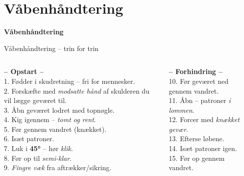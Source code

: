 \section{Våbenhåndtering}

\begin{frame}
  \vspace{3em}
  \begin{center}
    {\LARGE \textbf{Våbenhåndtering}}
  \end{center}
\end{frame}



\begin{frame}{Våbenhåndtering – trin for trin}
  \vspace{0.3em} %
  \begin{columns}[T]
    \setlength{\parskip}{0.28em} %
    \footnotesize
    \RaggedRight

    \textbf{-- Opstart --} \\
    1. Fødder i skudretning – fri for mennesker. \\
    2. Forskæfte med \textit{modsatte hånd} af skulderen du vil lægge geværet til. \\
    3. Åbn geværet lodret med topnøgle. \\
    4. Kig igennem – \textit{tomt og rent}. \\
    5. Før gennem vandret (knækket). \\
    6. Isæt patroner. \\
    7. Luk i \textbf{45°} – hør \textit{klik}. \\
    8. Før op til \textit{semi-klar}. \\
    9. \textit{Fingre væk} fra aftrækker/sikring. \par

    \vspace{0.3em} %
    \textbf{-- Forhindring --} \\
    10. Før geværet ned gennem vandret. \\
    11. Åbn – patroner \textit{i lommen}. \\
    12. Forcer med \textit{knækket gevær}. \\
    13. Efterse løbene. \\
    14. Isæt patroner igen. \\
    15. Før op gennem vandret. \par


\end{columns}
\end{frame}
